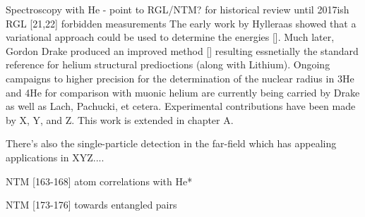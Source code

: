 Spectroscopy with He - point to RGL/NTM? for historical review until 2017ish
			RGL [21,22] forbidden measurements  
	The early work by Hylleraas showed that a variational approach could be used to determine the energies []. Much later, Gordon Drake produced an improved method [] resulting essnetially the standard reference for helium structural predioctions (along with Lithium). Ongoing campaigns to higher precision for the determination of the nuclear radius in 3He and 4He for comparison with muonic helium are currently being carried by Drake as well as Lach, Pachucki, et cetera. Experimental contributions have been made by X, Y, and Z. This work is extended in chapter A.
		
	There's also the single-particle detection in the far-field which has appealing applications in XYZ....
				
		NTM [163-168] atom correlations with He* 

		NTM [173-176] towards entangled pairs 



